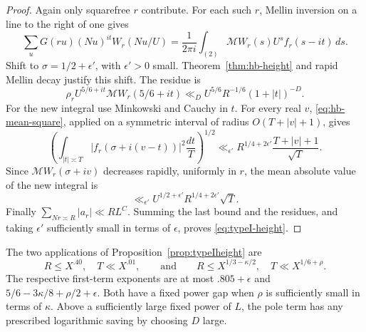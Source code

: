 \begin{proof}
Again only squarefree $r$ contribute.
For each such $r$, Mellin inversion on a line to the right of one gives
\[
 \sum_uG(ru)(Nu)^{it}W_r(Nu/U)
 =\frac{1}{2\pi i}\int_{(2)}
       \mathcal MW_r(s)U^s f_r(s-it)\,ds.
\]
Shift to $\sigma=1/2+\epsilon'$, with $\epsilon'>0$ small.
Theorem~\ref{thm:hb-height} and rapid Mellin decay justify this shift.
The residue is
\[
 \rho_r U^{5/6+it}\mathcal MW_r(5/6+it)
 \ll_D U^{5/6}R^{-1/6}(1+|t|)^{-D}.
\]
For the new integral use Minkowski and Cauchy in $t$.
For every real $v$, \eqref{eq:hb-mean-square}, applied on a symmetric
interval of radius $O(T+|v|+1)$, gives
\[
 \left(\int_{|t|\asymp T}
       |f_r(\sigma+i(v-t))|^2\frac{dt}{T}\right)^{1/2}
 \ll_{\epsilon'}R^{1/4+2\epsilon'}
              \frac{T+|v|+1}{\sqrt T}.
\]
Since $\mathcal MW_r(\sigma+iv)$ decreases rapidly, uniformly in $r$,
the mean absolute value of the new integral is
\[
 \ll_{\epsilon'} U^{1/2+\epsilon'}R^{1/4+2\epsilon'}\sqrt T.
\]
Finally $\sum_{Nr\asymp R}|a_r|\ll RL^C$.
Summing the last bound and the residues, and taking $\epsilon'$
sufficiently small in terms of $\epsilon$, proves
\eqref{eq:typeI-height}.
\end{proof}

The two applications of Proposition~\ref{prop:typeIheight} are
\[
 R\le X^{.40},\quad T\ll X^{.01},
 \qquad\text{and}\qquad
 R\le X^{1/3-\kappa/2},\quad T\ll X^{1/6+\rho}.
\]
The respective first-term exponents are at most $.805+\epsilon$ and
$5/6-3\kappa/8+\rho/2+\epsilon$.
Both have a fixed power gap when $\rho$ is sufficiently small in terms
of $\kappa$. Above a sufficiently large fixed power of $L$, the pole
term has any prescribed logarithmic saving by choosing $D$ large.
